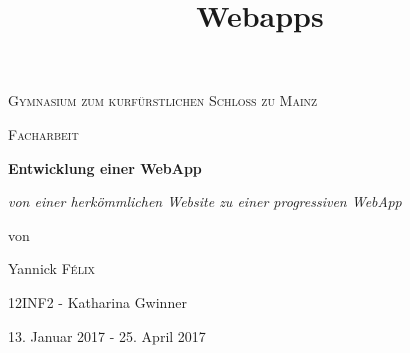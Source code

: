 \documentclass[a4paper,12pt,ngerman,listof=numbered]{scrartcl}      %
\title{Webapps}  %
\begin{document}
	
	\begin{titlepage}
		\centering
		{\scshape\Large Gymnasium zum kurf\"{u}rstlichen Schloss zu Mainz \par}
		\vspace{0.5cm}
		{\scshape\Large Facharbeit\par}
		\vspace{2.5cm}
		{\huge\bfseries Entwicklung einer WebApp\par}
		\vspace{1cm}
		{\Large\itshape von einer herkömmlichen Website zu einer progressiven WebApp\par}
		\vfill
		von\par
		Yannick \textsc{F\'elix}\par
		{\small 12INF2 - Katharina Gwinner}
		
		\vspace{3cm}
		
		{\large 13. Januar 2017 - 25. April 2017 \par}
		\newpage
	\end{titlepage}
	
	\setcounter{page}{1}
\end{document}
